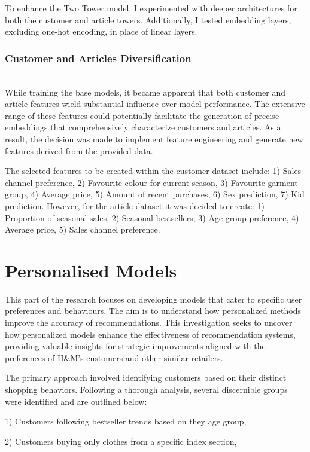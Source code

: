 \documentclass[conference,compsoc]{IEEEtran}
\begin{document}
To enhance the Two Tower model, I experimented with deeper architectures for both the customer and article towers. Additionally, I tested embedding layers, excluding one-hot encoding, in place of linear layers.

\subsubsection{Customer and Articles Diversification}\mbox{}\\
While training the base models, it became apparent that both customer and article features wield substantial influence over model performance. The extensive range of these features could potentially facilitate the generation of precise embeddings that comprehensively characterize customers and articles. As a result, the decision was made to implement feature engineering and generate new features derived from the provided data.

The selected features to be created within the customer dataset include:
1) Sales channel preference,
2) Favourite colour for current season,
3) Favourite garment group,
4) Average price,
5) Amount of recent purchases,
6) Sex prediction,
7) Kid prediction.
However, for the article dataset it was decided to create:
1) Proportion of seasonal sales,
2) Seasonal bestsellers,
3) Age group preference,
4) Average price,
5) Sales channel preference.

\section{Personalised Models}
This part of the research focuses on developing models that cater to specific user preferences and behaviours. The aim is to understand how personalized methods improve the accuracy of recommendations. This investigation seeks to uncover how personalized models enhance the effectiveness of recommendation systems, providing valuable insights for strategic improvements aligned with the preferences of H\&M's customers and other similar retailers.

The primary approach involved identifying customers based on their distinct shopping behaviors. Following a thorough analysis, several discernible groups were identified and are outlined below:

1) Customers following bestseller trends based on they age group,

2) Customers buying only clothes from a specific index section,
\end{document}

